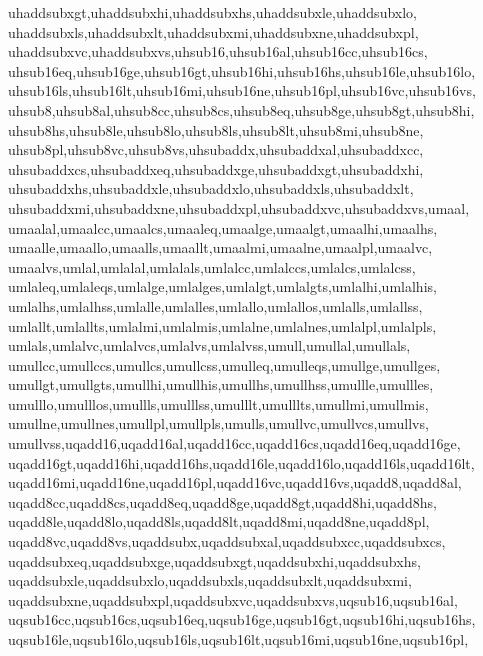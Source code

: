 {{      uhaddsubxgt,uhaddsubxhi,uhaddsubxhs,uhaddsubxle,uhaddsubxlo,            %
      uhaddsubxls,uhaddsubxlt,uhaddsubxmi,uhaddsubxne,uhaddsubxpl,            %
      uhaddsubxvc,uhaddsubxvs,uhsub16,uhsub16al,uhsub16cc,uhsub16cs,          %
      uhsub16eq,uhsub16ge,uhsub16gt,uhsub16hi,uhsub16hs,uhsub16le,uhsub16lo,  %
      uhsub16ls,uhsub16lt,uhsub16mi,uhsub16ne,uhsub16pl,uhsub16vc,uhsub16vs,  %
      uhsub8,uhsub8al,uhsub8cc,uhsub8cs,uhsub8eq,uhsub8ge,uhsub8gt,uhsub8hi,  %
      uhsub8hs,uhsub8le,uhsub8lo,uhsub8ls,uhsub8lt,uhsub8mi,uhsub8ne,         %
      uhsub8pl,uhsub8vc,uhsub8vs,uhsubaddx,uhsubaddxal,uhsubaddxcc,           %
      uhsubaddxcs,uhsubaddxeq,uhsubaddxge,uhsubaddxgt,uhsubaddxhi,            %
      uhsubaddxhs,uhsubaddxle,uhsubaddxlo,uhsubaddxls,uhsubaddxlt,            %
      uhsubaddxmi,uhsubaddxne,uhsubaddxpl,uhsubaddxvc,uhsubaddxvs,umaal,      %
      umaalal,umaalcc,umaalcs,umaaleq,umaalge,umaalgt,umaalhi,umaalhs,        %
      umaalle,umaallo,umaalls,umaallt,umaalmi,umaalne,umaalpl,umaalvc,        %
      umaalvs,umlal,umlalal,umlalals,umlalcc,umlalccs,umlalcs,umlalcss,       %
      umlaleq,umlaleqs,umlalge,umlalges,umlalgt,umlalgts,umlalhi,umlalhis,    %
      umlalhs,umlalhss,umlalle,umlalles,umlallo,umlallos,umlalls,umlallss,    %
      umlallt,umlallts,umlalmi,umlalmis,umlalne,umlalnes,umlalpl,umlalpls,    %
      umlals,umlalvc,umlalvcs,umlalvs,umlalvss,umull,umullal,umullals,        %
      umullcc,umullccs,umullcs,umullcss,umulleq,umulleqs,umullge,umullges,    %
      umullgt,umullgts,umullhi,umullhis,umullhs,umullhss,umullle,umullles,    %
      umulllo,umulllos,umullls,umulllss,umulllt,umulllts,umullmi,umullmis,    %
      umullne,umullnes,umullpl,umullpls,umulls,umullvc,umullvcs,umullvs,      %
      umullvss,uqadd16,uqadd16al,uqadd16cc,uqadd16cs,uqadd16eq,uqadd16ge,     %
      uqadd16gt,uqadd16hi,uqadd16hs,uqadd16le,uqadd16lo,uqadd16ls,uqadd16lt,  %
      uqadd16mi,uqadd16ne,uqadd16pl,uqadd16vc,uqadd16vs,uqadd8,uqadd8al,      %
      uqadd8cc,uqadd8cs,uqadd8eq,uqadd8ge,uqadd8gt,uqadd8hi,uqadd8hs,         %
      uqadd8le,uqadd8lo,uqadd8ls,uqadd8lt,uqadd8mi,uqadd8ne,uqadd8pl,         %
      uqadd8vc,uqadd8vs,uqaddsubx,uqaddsubxal,uqaddsubxcc,uqaddsubxcs,        %
      uqaddsubxeq,uqaddsubxge,uqaddsubxgt,uqaddsubxhi,uqaddsubxhs,            %
      uqaddsubxle,uqaddsubxlo,uqaddsubxls,uqaddsubxlt,uqaddsubxmi,            %
      uqaddsubxne,uqaddsubxpl,uqaddsubxvc,uqaddsubxvs,uqsub16,uqsub16al,      %
      uqsub16cc,uqsub16cs,uqsub16eq,uqsub16ge,uqsub16gt,uqsub16hi,uqsub16hs,  %
      uqsub16le,uqsub16lo,uqsub16ls,uqsub16lt,uqsub16mi,uqsub16ne,uqsub16pl,  %
}}
